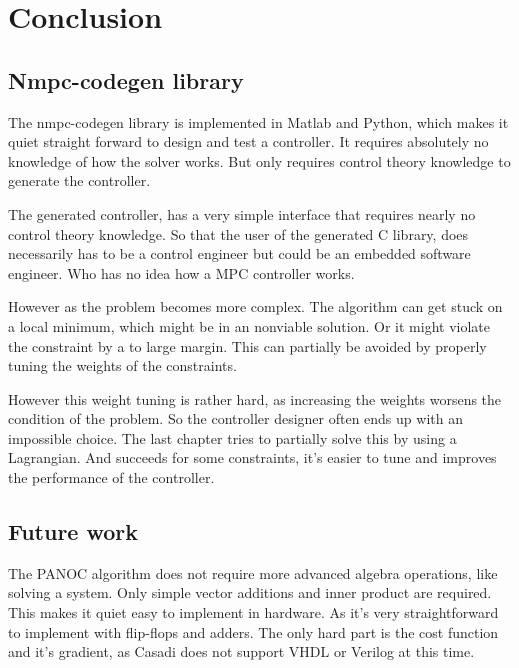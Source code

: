 \chapter{Conclusion}

\section{Nmpc-codegen library}
The nmpc-codegen library is implemented in Matlab and Python, which makes it quiet straight forward to design and test a controller. It requires absolutely no knowledge of how the solver works. But only requires control theory knowledge to generate the controller.

The generated controller, has a very simple interface that requires nearly no control theory knowledge. So that the user of the generated C library, does necessarily has to be a control engineer but could be an embedded software engineer. Who has no idea how a MPC controller works.

However as the problem becomes more complex. The algorithm can get stuck on a local minimum, which might be in an nonviable solution. Or it might violate the constraint by a to large margin. This can partially be avoided by properly tuning the weights of the constraints. 

However this weight tuning is rather hard, as increasing the weights worsens the condition of the problem. So the controller designer often ends up with an impossible choice. The last chapter tries to partially solve this by using a Lagrangian. And succeeds for some constraints, it's easier to tune and improves the performance of the controller. 

\section{Future work}
The PANOC algorithm does not require more advanced algebra operations, like solving a system. Only simple vector additions and inner product are required. This makes it quiet easy to implement in hardware. As it's very straightforward to implement with flip-flops and adders. The only hard part is the cost function and it's gradient, as Casadi does not support VHDL or Verilog at this time.


